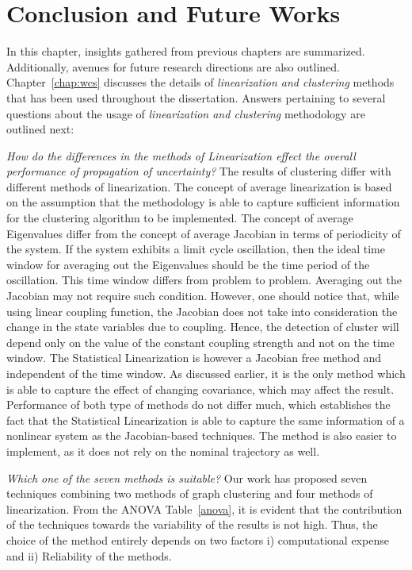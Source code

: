 \chapter{Conclusion and Future Works}
\label{chap:conclusion}

In this chapter, insights gathered from previous chapters are summarized. Additionally, avenues for future research directions are also outlined. Chapter~\ref{chap:wcs} discusses the details of \textit{linearization and clustering} methods that has been used throughout the dissertation. Answers pertaining to several questions about the usage of \textit{linearization and clustering} methodology are outlined next:

\textit{How do the differences in the methods of Linearization effect the overall performance of propagation of uncertainty?} The results of clustering differ with different methods of linearization. The concept of average linearization is based on the assumption that the methodology is able to capture sufficient information for the clustering algorithm to be implemented. The concept of average Eigenvalues differ from the concept of average Jacobian in terms of periodicity of the system. If the system exhibits a limit cycle oscillation, then the ideal time window for averaging out the Eigenvalues should be the time period of the oscillation. This time window differs from problem to problem. Averaging out the Jacobian may not require such condition. However, one should notice that, while using linear coupling function, the Jacobian does not take into consideration the change in the state variables due to coupling. Hence, the detection of cluster will depend only on the value of the constant coupling strength and not on the time window. The Statistical Linearization is however a Jacobian free method and independent of the time window. As discussed earlier, it is the only method which is able to capture the effect of changing covariance, which may affect the result. Performance of both type of methods do not differ much, which establishes the fact that the Statistical Linearization is able to capture the same information of a nonlinear system as the Jacobian-based techniques. The method is also easier to implement, as it does not rely on the nominal trajectory as well. 

\textit{Which one of the seven methods is suitable?} Our work has proposed seven techniques combining two methods of graph clustering and four methods of linearization. From the ANOVA Table~\ref{anova}, it is evident that the contribution of the techniques towards the variability of the results is not high. Thus, the choice of the method entirely depends on two factors i) computational expense and ii) Reliability of the methods.

